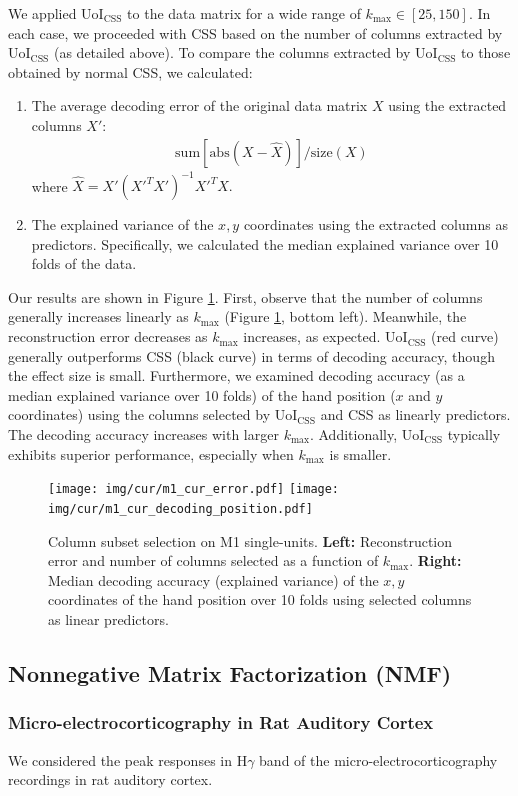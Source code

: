 \documentclass[11pt]{article}
\begin{document}
We applied UoI$_{\text{CSS}}$ to the data matrix for a wide range of $k_{\text{max}} \in [25, 150]$. In each case, we proceeded with CSS based on the number of columns extracted by UoI$_{\text{CSS}}$ (as detailed above). To compare the columns extracted by UoI$_{\text{CSS}}$ to those obtained by normal CSS, we calculated:
\begin{enumerate}[label=\textbf{(\arabic*)}]
\item The average decoding error of the original data matrix $X$ using the extracted columns $X'$:
\begin{align}
	\text{sum}\left[\text{abs}(X - \hat{X})\right]/\text{size}(X)
\end{align}
where $\hat{X} = X'(X'^T X')^{-1}X'^T X.$
\item The explained variance of the $x,y$ coordinates using the extracted columns as predictors. Specifically, we calculated the median explained variance over 10 folds of the data.
\end{enumerate}


Our results are shown in Figure \ref{fig:cur_m1}. First, observe that the number of columns generally increases linearly as $k_{\text{max}}$ (Figure \ref{fig:cur_m1}, bottom left). Meanwhile, the reconstruction error decreases as $k_{\text{max}}$ increases, as expected. UoI$_{\text{CSS}}$ (red curve) generally outperforms CSS (black curve) in terms of decoding accuracy, though the effect size is small. Furthermore, we examined decoding accuracy (as a median explained variance over 10 folds) of the hand position ($x$ and $y$ coordinates) using the columns selected by UoI$_{\text{CSS}}$ and CSS as linearly predictors. The decoding accuracy increases with larger $k_{\text{max}}$. Additionally, UoI$_{\text{CSS}}$ typically exhibits superior performance, especially when $k_{\text{max}}$ is smaller.

\begin{figure}[H]
	\centering
	\texttt{[image: img/cur/m1\_cur\_error.pdf]}
	\texttt{[image: img/cur/m1\_cur\_decoding\_position.pdf]}
	\caption{Column subset selection on M1 single-units. \textbf{Left: } Reconstruction error and number of columns selected as a function of $k_{\text{max}}$. \textbf{Right:} Median decoding accuracy (explained variance) of the $x,y$ coordinates of the hand position over 10 folds using selected columns as linear predictors.}
	\label{fig:cur_m1}
\end{figure}
\subsection{Nonnegative Matrix Factorization (NMF)}

\subsubsection{Micro-electrocorticography in Rat Auditory Cortex}
We considered the peak responses in H$\gamma$ band of the micro-electrocorticography recordings in rat auditory cortex. 
\end{document}
